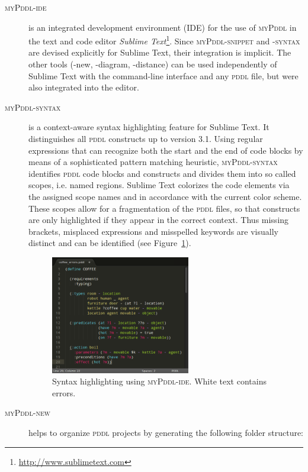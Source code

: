 \documentclass[runningheads]{llncs}
\newcommand{\mypddl}{\textsc{myPddl}\xspace}
\newcommand{\mypddlsyntax}{\textsc{myPddl-syntax}\xspace}
\newcommand{\mypddlnew}{\textsc{myPddl-new}\xspace}
\newcommand{\mypddlide}{\textsc{myPddl-ide}\xspace}
\newcommand{\mypddlsnippet}{\textsc{myPddl-snippet}\xspace}
\newcommand{\pddl}{\textsc{pddl}\xspace}
\newcommand{\sublimetext}{Sublime Text\xspace}
\begin{document}
\begin{description}
\item[\mypddlide] is an integrated development environment (IDE) for
  the use of \mypddl in the text and code editor \emph{Sublime
    Text}\footnote{\url{http://www.sublimetext.com}}. Since
  \mypddlsnippet and \textsc{-syntax} are devised explicitly for
  \sublimetext, their integration is implicit. The other tools (-new,
  -diagram, -distance) can be used independently of \sublimetext with
  the command-line interface and any \pddl file, but were also
  integrated into the editor.

\item[\mypddlsyntax] is a context-aware syntax highlighting feature
  for \sublimetext. It distinguishes all \pddl constructs up to
  version 3.1. Using regular expressions that can recognize both the
  start and the end of code blocks by means of a sophisticated pattern
  matching heuristic, \mypddlsyntax identifies \pddl code blocks and
  constructs and divides them into so called scopes, i.e. named
  regions. \sublimetext colorizes the code elements via the assigned
  scope names and in accordance with the current color scheme. These
  scopes allow for a fragmentation of the \pddl files, so that
  constructs are only highlighted if they appear in the correct
  context. Thus missing brackets, misplaced expressions and misspelled
  keywords are visually distinct and can be identified (see
  Figure~\ref{fig:syntax}).

  \begin{figure}
    \centering
    \includegraphics[width=0.6\textwidth]{coffee-yes.pdf}
    \caption{Syntax highlighting using \mypddlide. White
      text contains errors.}
\label{fig:syntax}
  \end{figure}

\item[\mypddlnew] helps to organize \pddl projects by generating the
following folder structure:


\end{description}
\end{document}
